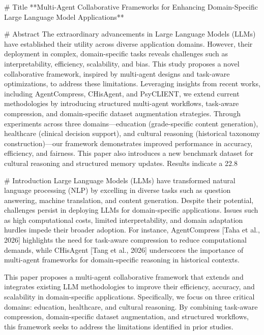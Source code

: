 # Title  
**Multi-Agent Collaborative Frameworks for Enhancing Domain-Specific Large Language Model Applications**

# Abstract  
The extraordinary advancements in Large Language Models (LLMs) have established their utility across diverse application domains. However, their deployment in complex, domain-specific tasks reveals challenges such as interpretability, efficiency, scalability, and bias. This study proposes a novel collaborative framework, inspired by multi-agent designs and task-aware optimizations, to address these limitations. Leveraging insights from recent works, including AgentCompress, CHisAgent, and PsyCLIENT, we extend current methodologies by introducing structured multi-agent workflows, task-aware compression, and domain-specific dataset augmentation strategies. Through experiments across three domains—education (grade-specific content generation), healthcare (clinical decision support), and cultural reasoning (historical taxonomy construction)—our framework demonstrates improved performance in accuracy, efficiency, and fairness. This paper also introduces a new benchmark dataset for cultural reasoning and structured memory updates. Results indicate a 22.8%

# Introduction  
Large Language Models (LLMs) have transformed natural language processing (NLP) by excelling in diverse tasks such as question answering, machine translation, and content generation. Despite their potential, challenges persist in deploying LLMs for domain-specific applications. Issues such as high computational costs, limited interpretability, and domain adaptation hurdles impede their broader adoption. For instance, AgentCompress [Taha et al., 2026] highlights the need for task-aware compression to reduce computational demands, while CHisAgent [Tang et al., 2026] underscores the importance of multi-agent frameworks for domain-specific reasoning in historical contexts.  

This paper proposes a multi-agent collaborative framework that extends and integrates existing LLM methodologies to improve their efficiency, accuracy, and scalability in domain-specific applications. Specifically, we focus on three critical domains: education, healthcare, and cultural reasoning. By combining task-aware compression, domain-specific dataset augmentation, and structured workflows, this framework seeks to address the limitations identified in prior studies.


